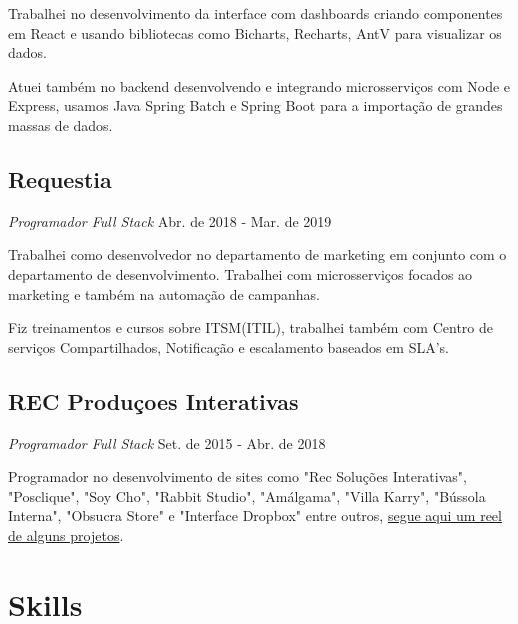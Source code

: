 \documentclass[a4paper,10pt]{article}
\begin{document}
Trabalhei no desenvolvimento da interface com dashboards
criando componentes em React e usando bibliotecas como
Bicharts, Recharts, AntV para visualizar os dados.

Atuei também no backend desenvolvendo e integrando microsserviços com Node e Express,
usamos Java Spring Batch e Spring Boot para a importação de grandes massas de dados.

\clearpage

\subsection*{Requestia}
\textcolor{corSubSection}{\emph{Programador Full Stack}}
\hfill \textcolor{corSubSection}{Abr. de 2018 - Mar. de 2019}

Trabalhei como desenvolvedor no departamento de marketing
em conjunto com o departamento de desenvolvimento.
Trabalhei com microsserviços focados ao marketing
e também na automação de campanhas.

Fiz treinamentos e cursos sobre ITSM(ITIL),
trabalhei também com Centro de serviços Compartilhados,
Notificação e escalamento baseados em SLA's.

\subsection*{REC Produçoes Interativas}
\textcolor{corSubSection}{\emph{Programador Full Stack}}
\hfill \textcolor{corSubSection}{Set. de 2015 - Abr. de 2018}

Programador no desenvolvimento de sites como "Rec Soluções Interativas",
"Posclique", "Soy Cho", "Rabbit Studio", "Amálgama", "Villa Karry",
"Bússola Interna", "Obsucra Store" e "Interface Dropbox" entre outros,
\href{https://www.youtube.com/watch?v=V_ahsuHgIoE}{segue aqui um reel de alguns projetos}.

%


\section*{Skills}
\noindent\makebox[\linewidth]{\rule{\linewidth}{0.1mm}\textcolor{corLarge}{}}
\end{document}
